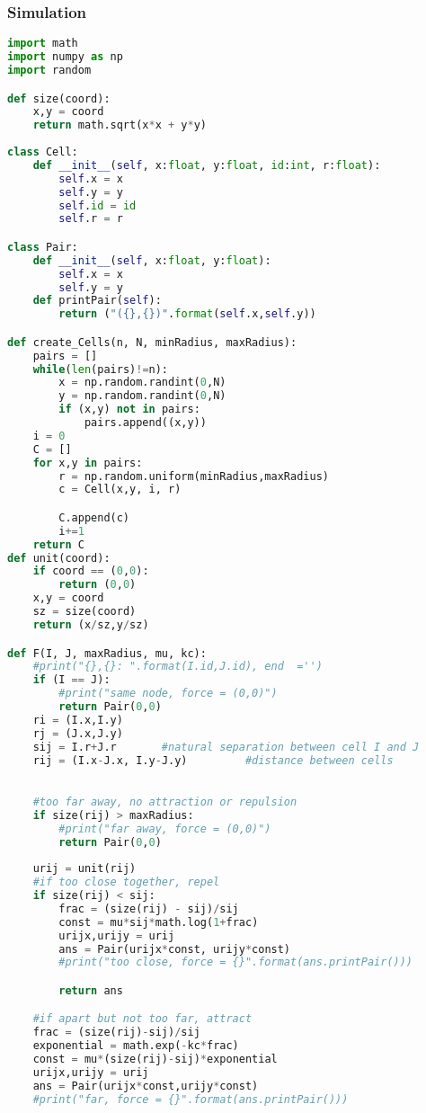\documentclass[11pt,a4paper]{article}
\begin{document}
\subsubsection{Simulation}
\begin{lstlisting}[language=Python, mathescape=true]
import math
import numpy as np
import random

def size(coord):
    x,y = coord
    return math.sqrt(x*x + y*y)
    
class Cell:
    def __init__(self, x:float, y:float, id:int, r:float):
        self.x = x
        self.y = y
        self.id = id
        self.r = r

class Pair:
    def __init__(self, x:float, y:float):
        self.x = x
        self.y = y
    def printPair(self):
        return ("({},{})".format(self.x,self.y))

def create_Cells(n, N, minRadius, maxRadius):
    pairs = []
    while(len(pairs)!=n):
        x = np.random.randint(0,N)
        y = np.random.randint(0,N)
        if (x,y) not in pairs:
            pairs.append((x,y))
    i = 0
    C = []
    for x,y in pairs:
        r = np.random.uniform(minRadius,maxRadius)
        c = Cell(x,y, i, r)

        C.append(c)
        i+=1
    return C
def unit(coord):
    if coord == (0,0):
        return (0,0)
    x,y = coord
    sz = size(coord)
    return (x/sz,y/sz)

def F(I, J, maxRadius, mu, kc):
    #print("{},{}: ".format(I.id,J.id), end  ='')
    if (I == J):
        #print("same node, force = (0,0)")
        return Pair(0,0)
    ri = (I.x,I.y)
    rj = (J.x,J.y)
    sij = I.r+J.r       #natural separation between cell I and J
    rij = (I.x-J.x, I.y-J.y)         #distance between cells
    

    #too far away, no attraction or repulsion
    if size(rij) > maxRadius:
        #print("far away, force = (0,0)")
        return Pair(0,0)
    
    urij = unit(rij)
    #if too close together, repel
    if size(rij) < sij:
        frac = (size(rij) - sij)/sij
        const = mu*sij*math.log(1+frac)
        urijx,urijy = urij
        ans = Pair(urijx*const, urijy*const)
        #print("too close, force = {}".format(ans.printPair()))

        return ans

    #if apart but not too far, attract
    frac = (size(rij)-sij)/sij
    exponential = math.exp(-kc*frac)
    const = mu*(size(rij)-sij)*exponential
    urijx,urijy = urij
    ans = Pair(urijx*const,urijy*const)
    #print("far, force = {}".format(ans.printPair()))


\end{lstlisting}
\end{document}
